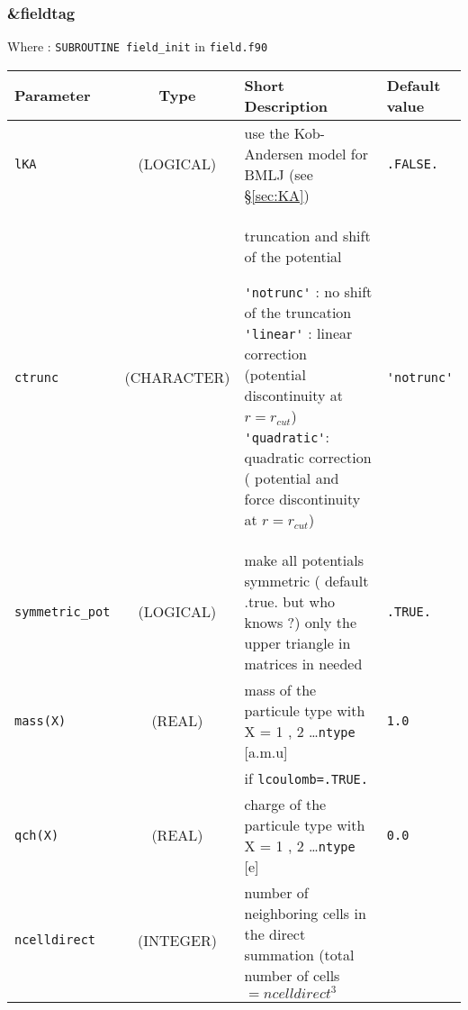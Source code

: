 \documentclass[a4paper]{article}
\begin{document}
\subsubsection{\&fieldtag}

Where : \verb?SUBROUTINE field_init? in \verb?field.f90?
\newline

\begin{longtable}{l|c|m{8cm}|m{2cm}}
\hline
\hline
Parameter        &  Type              &          Short Description                                                          & Default value \\
\hline
\hline
\rule[-0.75cm]{0cm}{1.5cm}
\verb?lKA?       &  (LOGICAL)         & use the Kob-Andersen model for BMLJ (see \S \ref{sec:KA})                           & \verb?.FALSE.? \\
\hline
\rule[-0.75cm]{0cm}{1.5cm}
\verb?ctrunc?    &  (CHARACTER)       & \newline truncation and shift of the potential \newline 

                                                    \verb?'notrunc'? : no shift of the truncation \newline 
                                                    \verb?'linear'?  : linear correction (potential 
                                                                       discontinuity at $r=r_{cut}$) \newline 
                   			            \verb?'quadratic'?: quadratic correction ( potential and force 
                                                    discontinuity at $r=r_{cut}$) \newline                                  & \verb?'notrunc'? \tabularnewline
\hline
\rule[-0.75cm]{0cm}{1.5cm}
\verb?symmetric_pot?         
                 & (LOGICAL)          &  make all potentials symmetric ( default .true. but who knows ?) \newline  
	                                   only the upper triangle in matrices in needed                                    & \verb?.TRUE.? \tabularnewline
\hline
\rule[-0.75cm]{0cm}{1.5cm}
\verb?mass(X)?   &  (REAL)            & mass of the particule type with X = 1 , 2 \ldots \verb?ntype? [a.m.u]               & \verb?1.0? \\
\hline
\hline
\rule[-0.75cm]{0cm}{1.5cm}
                 &                    & if \verb?lcoulomb=.TRUE.? & \\
\hline
\rule[-0.75cm]{0cm}{1.5cm}
\verb?qch(X)?    &  (REAL)            & charge of the particule type with X = 1 , 2 \ldots \verb?ntype? [e]                 & \verb?0.0?\\
\hline
\rule[-0.75cm]{0cm}{1.5cm}
\verb?ncelldirect?           
                 &  (INTEGER)         & \newline number of neighboring cells in the direct summation 
                                         (total number of cells $=ncelldirect^3$ \newline 


\end{longtable}
\end{document}
